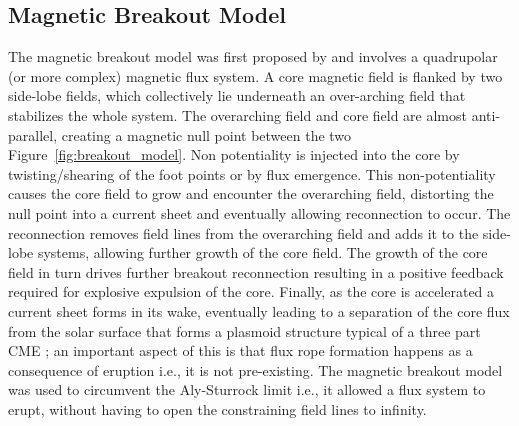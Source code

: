 \subsection{Magnetic Breakout Model}\label{sec:21}

The magnetic breakout model was first proposed by \citep{antiochos1999} and involves a quadrupolar (or more complex) magnetic flux system. A core magnetic field is flanked by two side-lobe fields, which collectively lie underneath an over-arching field that stabilizes the whole system. The overarching field and core field are almost anti-parallel, creating a magnetic null point between the two Figure~\ref{fig:breakout_model}. Non potentiality is injected into the core by twisting/shearing of the foot points or by flux emergence. This non-potentiality causes the core field to grow and encounter the overarching field, distorting the null point into a current sheet and eventually allowing reconnection to occur. The reconnection removes field lines from the overarching field and adds it to the side-lobe systems, allowing further growth of the core field. The growth of the core field in turn drives further breakout reconnection resulting in a positive feedback required for explosive expulsion of the core. Finally, as the core is accelerated a current sheet forms in its wake, eventually leading to a separation of the core flux from the solar surface that forms a plasmoid structure typical of a three part CME \citep{lynch2004}; an important aspect of this is that flux rope formation happens as a consequence of eruption i.e., it is not pre-existing. The magnetic breakout model was used to circumvent the Aly-Sturrock limit \citep{aly1991, sturrock1991} i.e., it allowed a flux system to erupt, without having to open the constraining field lines to infinity.
